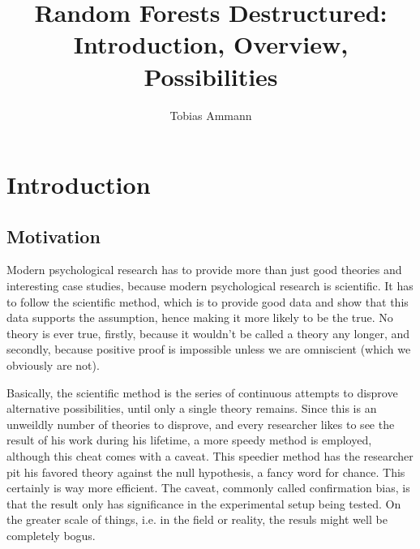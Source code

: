 \documentclass[a4paper,man,12pt,apacite]{apa6} %
\begin{document}
\title{Random Forests Destructured: Introduction, Overview, Possibilities}
\author{Tobias Ammann}


\maketitle

\tableofcontents

\section{Introduction}

\subsection{Motivation}
Modern psychological research has to provide more than just good theories
and interesting case studies, because modern psychological research is
scientific. It has to follow the scientific method, which is to
provide good data and show that this data supports the assumption, hence
making it more likely to be the true. No theory is ever true, firstly,
because it wouldn't be called a theory any longer, and secondly, because
positive proof is impossible unless we are omniscient
(which we obviously are not).

Basically, the scientific method is the series of continuous attempts to
disprove alternative possibilities, until only a single theory remains.
Since this is an unweildly number of theories to disprove, and every
researcher likes to see the result of his work during his lifetime, a
more speedy method is employed, although this cheat comes with a caveat.
This speedier method has the researcher pit his favored theory against
the null hypothesis, a fancy word for chance. This certainly is
way more efficient. The caveat, commonly called confirmation bias, is that
the result only has significance in the experimental setup being tested.
On the greater scale of things, i.e. in the field or reality, the resuls
might well be completely bogus.
\end{document}

